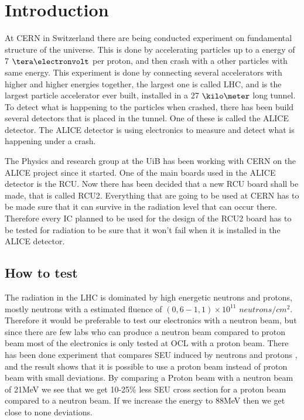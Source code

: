\begin{section}

\section{Introduction}
At \acf{CERN} in Switzerland there are being conducted experiment on fundamental structure of the universe. This is done by accelerating particles up to a energy of 7 $\tera \electronvolt$ per proton, and then crash with a other particles with same energy. This experiment is done by connecting several accelerators with higher and higher energies together, the largest one is called \acf{LHC}, and is the largest particle accelerator ever built, installed in a 27 $\kilo \meter$ long tunnel.
To detect what is happening to the particles when crashed, there has been build several detectors that is placed in the tunnel. One of these is called the \acf{ALICE} detector. The \ac{ALICE} detector is using electronics to measure and detect what is happening under a crash.

The Physics and research group at the \acf{UiB} has been working with \ac{CERN} on the \ac{ALICE} project since it started.
One of the main boards used in the \ac{ALICE} detector is the \acf{RCU}. Now there has been decided that a new \ac{RCU} board shall be made, that is called \ac{RCU2}.
Everything that are going to be used at \ac{CERN} has to be made sure that it can survive in the radiation level that can occur there. Therefore every \acf{IC} planned to be used for the design of the \ac{RCU2} board has to be tested for radiation to be sure that it won't fail when it is installed in the \ac{ALICE} detector.

\subsection{How to test}
\label{how_to_test}
The radiation in the \ac{LHC} is dominated by high energetic neutrons and protons, mostly neutrons with a estimated fluence of $(0,6-1,1)\times 10^{11}$ $neutrons/cm^2$. Therefore it would be preferable to test our electronics with a neutron beam, but since there are few labs who can produce a neutron beam compared to proton beam most of the electronics is only tested at \ac{OCL} with a proton beam.
There has been done experiment that compares SEU induced by neutrons and protons \cite{GranlundOlsson}, and the result shows that it is possible to use a proton beam instead of proton beam with small deviations. By comparing a Proton beam with a neutron beam of 21MeV we see that we get 10-25\% less SEU cross section for a proton beam compared to a neutron beam.
If we increase the energy to 88MeV then we get close to none deviations. 


\end{section}
